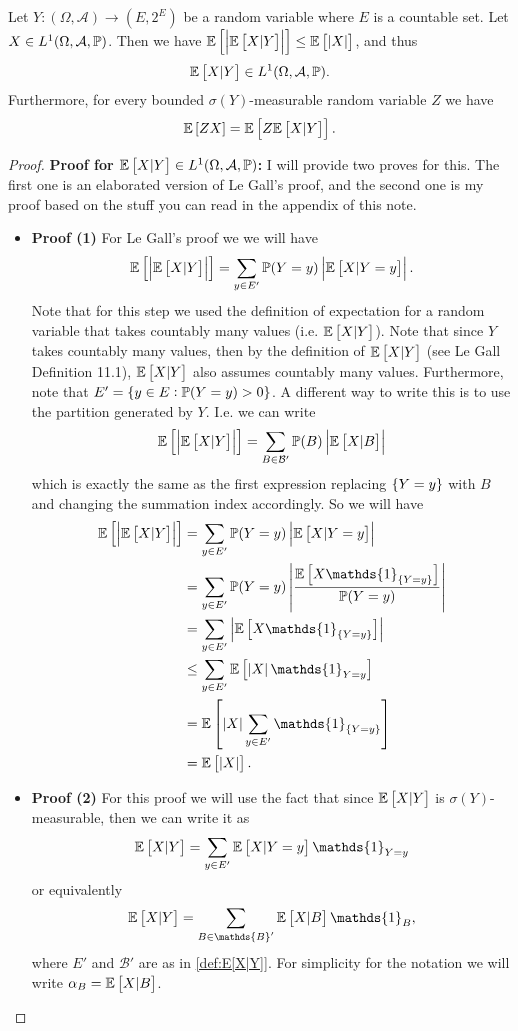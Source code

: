 \begin{theorem}
	Let $ Y: (\Omega,\mathcal{A}) \to (E,2^E) $ be a random variable where $ E $ is a countable set. Let $ X \in L^1(\Omega, \mathcal{A},\mathbb{P}) $. Then we have $ \mathbb{E}\left[\left|\mathbb{E}\left[X|Y\right]\right|\right] \leq \mathbb{E}\left[\left|X\right|\right] $, and thus 
	\[ \mathbb{E}\left[X|Y\right] \in L^1(\Omega, \mathcal{A},\mathbb{P}). \]
	Furthermore, for every bounded $ \sigma(Y) $-measurable random variable $ Z $ we have
	\[ \mathbb{E}\left[ZX\right] = \mathbb{E}\left[Z\mathbb{E}\left[X|Y\right]\right]. \]
\end{theorem}
\begin{proof}
	\textbf{Proof for $ \mathbb{E}\left[X|Y\right] \in L^1(\Omega,\mathcal{A},\mathbb{P}) $:} 
	I will provide two proves for this. The first one is an elaborated version of Le Gall's proof, and the second one is my proof based on the stuff you can read in the appendix of this note.
	\begin{itemize}
		\item \textbf{Proof (1)} For Le Gall's proof we we will have
		\[ \mathbb{E}\left[\left|\mathbb{E}\left[X|Y\right]\right|\right] = \sum_{y\in E'} \mathbb{P}(Y=y)\left|\mathbb{E}\left[X|Y=y\right]\right|. \]
		Note that for this step we used the definition of expectation for a random variable that takes countably many values (i.e. $ \mathbb{E}\left[X|Y\right] $). Note that since $ Y $ takes countably many values, then by the definition of $ \mathbb{E}\left[X|Y\right] $ (see Le Gall Definition 11.1), $ \mathbb{E}\left[X|Y\right] $ also assumes countably many values. Furthermore, note that $ E' = \{y \in E: \mathbb{P}(Y=y)> 0\} $. A different way to write this is to use the partition generated by $ Y $. I.e. we can write
		\[ \mathbb{E}\left[\left|\mathbb{E}\left[X|Y\right]\right|\right] = \sum_{B\in \mathcal{B}'} \mathbb{P}(B) \left|\mathbb{E}\left[X|B\right]\right| \]
		which is exactly the same as the first expression replacing $ \{Y = y\} $ with $ B $ and changing the summation index accordingly. So we will have
		\begin{align*}
			\E{\abs{\E{X|Y}}} &= \sum_{y\in E'} \prob(Y=y) \abs{\E{X|Y=y}} \\
			&= \sum_{y\in E'} \prob(Y=y) \abs{\frac{\E{X\mathds{1}_{\set{Y=y}}}}{\prob(Y=y)}} \\
			&= \sum_{y \in E'}\abs{\E{X\mathds{1}_{\set{Y=y}}}} \\
			&\leq \sum_{y\in E'}\E{\abs{X}\mathds{1}_{Y=y}} \\
			&= \E{\abs{X}\sum_{y\in E'}\mathds{1}_{\set{Y=y}}} \\
			&= \E{\abs{X}}.
		\end{align*}
		
		\item \textbf{Proof (2)}
		For this proof we will use the fact that since $ \mathbb{E}\left[X|Y\right] $ is $ \sigma(Y) $-measurable, then we can write it as
		\[ \E{X|Y} = \sum_{y\in E'} \E{X|Y=y} \mathds{1}_{Y=y} \]
		or equivalently
		\[ \E{X|Y} = \sum_{B\in \mathds{B}'} \E{X|B} \mathds{1}_{B}, \]
		where $ E' $ and $ \mathcal{B}' $ are as in \autoref{def:E[X|Y]}. For simplicity for the notation we will write $ \alpha_B = \mathbb{E}\left[X|B\right] $.
		

\end{itemize}
\end{proof}
